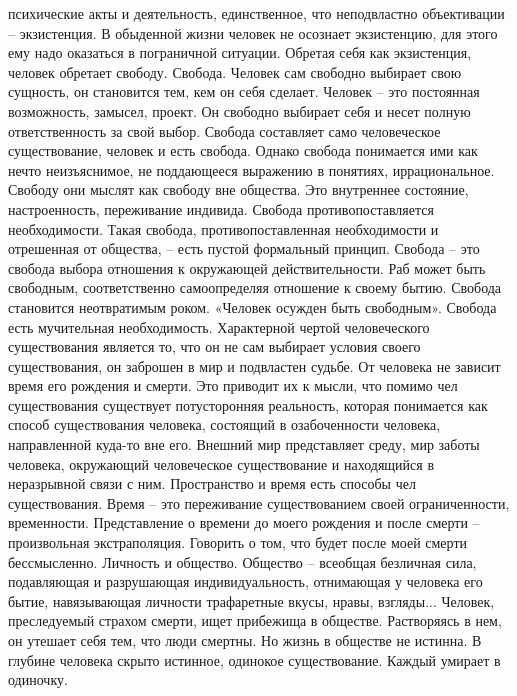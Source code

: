 \documentclass[12pt]{article}
\begin{document}
психические акты и деятельность, единственное, что неподвластно объективации – экзистенция. В обыденной
жизни человек не осознает экзистенцию, для этого ему надо оказаться в пограничной ситуации.
Обретая себя как экзистенция, человек обретает свободу.
Свобода. Человек сам свободно выбирает свою сущность, он становится тем, кем он себя сделает. Человек – это
постоянная возможность, замысел, проект. Он свободно выбирает себя и несет полную ответственность за свой
выбор. Свобода составляет само человеческое существование, человек и есть свобода.
Однако свобода понимается ими как нечто неизъяснимое, не поддающееся выражению в понятиях,
иррациональное. Свободу они мыслят как свободу вне общества. Это внутреннее состояние, настроенность,
переживание индивида. Свобода противопоставляется необходимости. Такая свобода, противопоставленная
необходимости и отрешенная от общества, – есть пустой формальный принцип. Свобода – это свобода выбора
отношения к окружающей действительности. Раб может быть свободным, соответственно самоопределяя
отношение к своему бытию. Свобода становится неотвратимым роком. «Человек осужден быть свободным».
Свобода есть мучительная необходимость.
Характерной чертой человеческого существования является то, что он не сам выбирает условия своего
существования, он заброшен в мир и подвластен судьбе. От человека не зависит время его рождения и смерти.
Это приводит их к мысли, что помимо чел существования существует потусторонняя реальность, которая
понимается как способ существования человека, состоящий в озабоченности человека, направленной куда-то
вне его. Внешний мир представляет среду, мир заботы человека, окружающий человеческое существование и
находящийся в неразрывной связи с ним. Пространство и время есть способы чел существования. Время – это
переживание существованием своей ограниченности, временности. Представление о времени до моего
рождения и после смерти – произвольная экстраполяция. Говорить о том, что будет после моей смерти
бессмысленно.
Личность и общество. Общество – всеобщая безличная сила, подавляющая и разрушающая индивидуальность,
отнимающая у человека его бытие, навязывающая личности трафаретные вкусы, нравы, взгляды... Человек,
преследуемый страхом смерти, ищет прибежища в обществе. Растворяясь в нем, он утешает себя тем, что люди
смертны. Но жизнь в обществе не истинна. В глубине человека скрыто истинное, одинокое существование.
Каждый умирает в одиночку.
\end{document}
